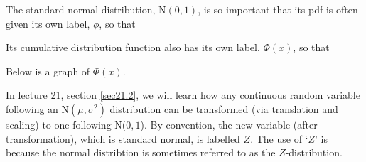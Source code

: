 \noindent The standard normal distribution, N$(0,1)$, is so important that its pdf is often given its own label, $\phi$, so that

  	\bigskip
	
	\hfil{}
	\bigskip
	
\noindent Its cumulative distribution function also has its own label, $\Phi(x)$, so that

  	\bigskip
	
	\hfil{}
	\bigskip
	
\noindent Below is a graph of $\Phi(x)$.
\begin{center}
\end{center}

\noindent In lecture 21, section \ref{sec21.2}, we will learn how any continuous random variable following an N$(\mu,\sigma^2)$ distribution can be transformed (via translation and scaling) to one following N($0,1$). By convention, the new variable (after transformation), which is standard normal, is labelled $Z$. The use of `$Z$' is because the normal distribtion is sometimes referred to as the $Z$-distribution.

